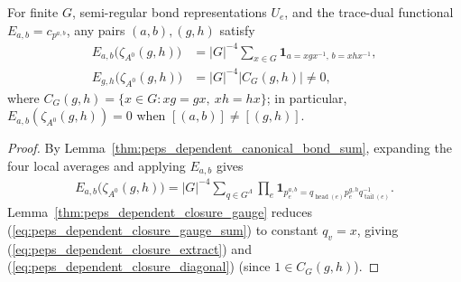 \begin{lemma}%
    \label{thm:peps_dependent_closure_extraction}
    \leanok
    For finite $G$, semi-regular bond representations $U_e$, and the
    trace-dual functional $E_{a,b}=c_{p^{a,b}}$, any pairs $(a,b),(g,h)$
    satisfy
    \begin{align}
        E_{a,b}\bigl(\zeta_{A^0}(g,h)\bigr)
         & = |G|^{-4}\sum_{x\in G}
        \mathbf 1_{a=xgx^{-1},\,b=xhx^{-1}},
        \label{eq:peps_dependent_closure_extract} \\
        E_{g,h}\bigl(\zeta_{A^0}(g,h)\bigr)
         & = |G|^{-4}|C_G(g,h)|\ne0,
        \label{eq:peps_dependent_closure_diagonal}
    \end{align}
    where $C_G(g,h)=\{x\in G:xg=gx,\ xh=hx\}$; in particular,
    $E_{a,b}(\zeta_{A^0}(g,h))=0$ when $[(a,b)]\ne[(g,h)]$.
\end{lemma}
\begin{proof}\leanok
    By Lemma~\ref{thm:peps_dependent_canonical_bond_sum}, expanding the
    four local averages and applying $E_{a,b}$ gives
    \begin{align}
        E_{a,b}\bigl(\zeta_{A^0}(g,h)\bigr)
        = |G|^{-4}\sum_{q\in G^\Lambda}
        \prod_e\mathbf 1_{p^{a,b}_e
                =q_{\operatorname{head}(e)}p^{g,h}_e
                q_{\operatorname{tail}(e)}^{-1}}.
        \label{eq:peps_dependent_closure_gauge_sum}
    \end{align}
    Lemma~\ref{thm:peps_dependent_closure_gauge} reduces
    (\ref{eq:peps_dependent_closure_gauge_sum}) to constant $q_v=x$,
    giving (\ref{eq:peps_dependent_closure_extract}) and
    (\ref{eq:peps_dependent_closure_diagonal}) (since $1\in C_G(g,h)$).
\end{proof}

